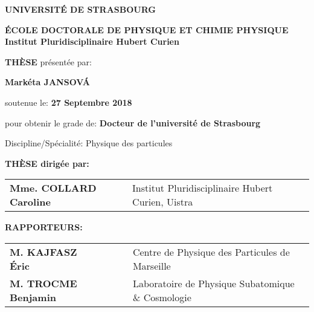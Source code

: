 \begin{titlepage}
    \begin{center}
    \vspace*{-2cm}
        {\Large \textbf{UNIVERSITÉ DE STRASBOURG}}\\

        \vspace*{1cm}

        {\large \textbf{ÉCOLE DOCTORALE DE PHYSIQUE ET CHIMIE PHYSIQUE}}\\
        \textbf{Institut Pluridisciplinaire Hubert Curien}\\

        \vspace*{1cm}

        {\LARGE \textbf{TH\`{E}SE}} présentée par:

        \vspace*{0.3cm}

        {\Large \textbf{Mark\'{e}ta JANSOV\'{A}}}

        soutenue le: \textbf{27 Septembre 2018}
        

        \vspace*{1cm}

        pour obtenir le grade de: \textbf{Docteur de l'université de Strasbourg}


        Discipline/Spécialité: Physique des particules


        \vspace*{1cm}

        \fbox{
        \parbox{\textwidth}{\centering \LARGE \textbf{Recherche du partenaire supersymétrique du quark top et mesure des propriétés des dépôts dans le trajectographe à pistes de silicium de l’expérience CMS au Run 2}} %
         }

        \end{center}

        \vspace*{1cm}

        {\large \textbf{THÈSE dirigée par:}}\\
        \begin{tabular}{ll}
        \hspace{1cm}    \textbf{Mme. COLLARD Caroline}          & Institut Pluridisciplinaire Hubert Curien, Uistra \\
        \end{tabular}
        
        {\large \textbf{RAPPORTEURS:}} \\
        \begin{tabular}{ll}
            \hspace{1cm}    \textbf{M. KAJFASZ Éric~~~~~~~~}                & Centre de Physique des Particules de Marseille\\
            \hspace{1cm}    \textbf{M. TROCME Benjamin}             & Laboratoire de Physique Subatomique \& Cosmologie \\
        \end{tabular}
        \vspace*{0.5cm}
        \hline


\end{titlepage}
